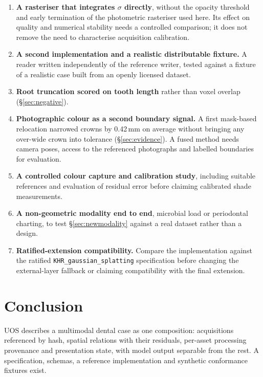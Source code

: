 \documentclass[11pt,a4paper]{article}
\newcommand{\code}[1]{\texttt{\small #1}}
\begin{document}
\begin{enumerate}
  \item \textbf{A rasteriser that integrates $\sigma$ directly}, without the opacity
  threshold and early termination of the photometric rasteriser used here. Its effect on
  quality and numerical stability needs a controlled comparison; it does not remove the need
  to characterise acquisition calibration.
  \item \textbf{A second implementation and a realistic distributable fixture.} A reader
  written independently of the reference writer, tested against a fixture of a realistic case
  built from an openly licensed dataset.
  \item \textbf{Root truncation scored on tooth length} rather than voxel overlap
  (\S\ref{sec:negative}).
  \item \textbf{Photographic colour as a second boundary signal.} A first mask-based
  relocation narrowed crowns by 0.42\,mm on average without bringing any over-wide crown into
  tolerance (\S\ref{sec:evidence}). A fused method needs camera poses, access to the
  referenced photographs and labelled boundaries for evaluation.
  \item \textbf{A controlled colour capture and calibration study}, including suitable references
  and evaluation of residual error before claiming calibrated shade measurements.
  \item \textbf{A non-geometric modality end to end}, microbial load or periodontal
  charting, to test \S\ref{sec:newmodality} against a real dataset rather than a design.
  \item \textbf{Ratified-extension compatibility.} Compare the implementation against the
  ratified \code{KHR\_gaussian\_splatting} specification before changing the external-layer
  fallback or claiming compatibility with the final extension.
\end{enumerate}


\section{Conclusion}

UOS describes a multimodal dental case as one composition: acquisitions referenced by hash,
spatial relations with their residuals, per-asset processing provenance and presentation
state, with model output separable from the rest. A specification, schemas, a reference
implementation and synthetic conformance fixtures exist.
\end{document}
